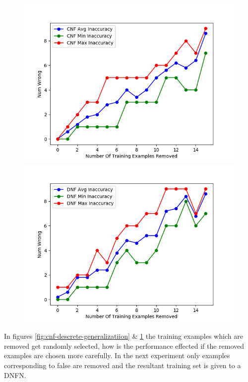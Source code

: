 \begin{figure}[H]
	\centering
	\begin{minipage}[b]{0.45\textwidth}
		\includegraphics[width=\textwidth]{cnf-descrete-generalization.png}
		\caption{}
		\label{fig:cnf-descrete-generalizatiion}
	\end{minipage}
	\begin{minipage}[b]{0.45\textwidth}
		\includegraphics[width=\textwidth]{dnf-descrete-generalization.png}
		\caption{}
		\label{fig:dnf-descrete-generalizatiion}
	\end{minipage}
	\hfill
\end{figure}

In figures \ref{fig:cnf-descrete-generalizatiion} \& \ref{fig:dnf-descrete-generalizatiion} the training examples which are removed get randomly selected, how is the performance effected if the removed examples are chosen more carefully. In the next experiment only examples corresponding to false are removed and the resultant training set is given to a DNFN.

